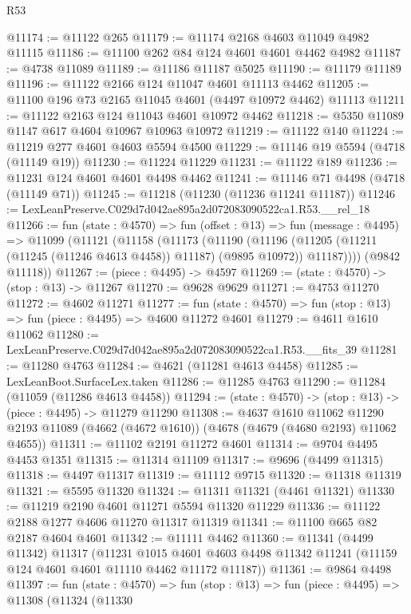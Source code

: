 \begin{lexlean}{R53}
\begin{coremodule}
@11174 := @11122 @265
@11179 := @11174 @2168 @4603 @11049 @4982 @11115
@11186 := @11100 @262 @84 @124 @4601 @4601 @4462 @4982
@11187 := @4738 @11089
@11189 := @11186 @11187 @5025
@11190 := @11179 @11189
@11196 := @11122 @2166 @124 @11047 @4601 @11113 @4462
@11205 := @11100 @196 @73 @2165 @11045 @4601 (@4497 @10972 @4462) @11113
@11211 := @11122 @2163 @124 @11043 @4601 @10972 @4462
@11218 := @5350 @11089 @1147 @617 @4604 @10967 @10963 @10972
@11219 := @11122 @140
@11224 := @11219 @277 @4601 @4603 @5594 @4500
@11229 := @11146 @19 @5594 (@4718 (@11149 @19))
@11230 := @11224 @11229
@11231 := @11122 @189
@11236 := @11231 @124 @4601 @4601 @4498 @4462
@11241 := @11146 @71 @4498 (@4718 (@11149 @71))
@11245 := @11218 (@11230 (@11236 @11241 @11187))
@11246 := LexLeanPreserve.C029d7d042ae895a2d072083090522ca1.R53.__rel_18
@11266 := fun (state : @4570) =>
  fun (offset : @13) =>
  fun (message : @4495) =>
  @11099
    (@11121
      (@11158
        (@11173
          (@11190
            (@11196 (@11205 (@11211 (@11245 (@11246 @4613 @4458)) @11187) (@9895 @10972)) @11187))))
      (@9842 @11118))
@11267 := (piece : @4495) -> @4597
@11269 := (state : @4570) -> (stop : @13) -> @11267
@11270 := @9628 @9629
@11271 := @4753 @11270
@11272 := @4602 @11271
@11277 := fun (state : @4570) => fun (stop : @13) => fun (piece : @4495) => @4600 @11272 @4601
@11279 := @4611 @1610 @11062
@11280 := LexLeanPreserve.C029d7d042ae895a2d072083090522ca1.R53.__fits_39
@11281 := @11280 @4763
@11284 := @4621 (@11281 @4613 @4458)
@11285 := LexLeanBoot.SurfaceLex.taken
@11286 := @11285 @4763
@11290 := @11284 (@11059 (@11286 @4613 @4458))
@11294 := (state : @4570) -> (stop : @13) -> (piece : @4495) -> @11279 @11290
@11308 := @4637
    @1610
    @11062
    @11290
    @2193
    @11089
    (@4662 (@4672 @1610))
    (@4678 (@4679 (@4680 @2193) @11062 @4655))
@11311 := @11102 @2191 @11272 @4601
@11314 := @9704 @4495 @4453 @1351
@11315 := @11314 @11109
@11317 := @9696 (@4499 @11315)
@11318 := @4497 @11317
@11319 := @11112 @9715
@11320 := @11318 @11319
@11321 := @5595 @11320
@11324 := @11311 @11321 (@4461 @11321)
@11330 := @11219 @2190 @4601 @11271 @5594 @11320 @11229
@11336 := @11122 @2188 @1277 @4606 @11270 @11317 @11319
@11341 := @11100 @665 @82 @2187 @4604 @4601
@11342 := @11111 @4462
@11360 := @11341
    (@4499 @11342)
    @11317
    (@11231
      @1015
      @4601
      @4603
      @4498
      @11342
      @11241
      (@11159 @124 @4601 @4601 @11110 @4462 @11172 @11187))
@11361 := @9864 @4498
@11397 := fun (state : @4570) =>
  fun (stop : @13) =>
  fun (piece : @4495) =>
  @11308
    (@11324
      (@11330

\end{coremodule}
\end{lexlean}

